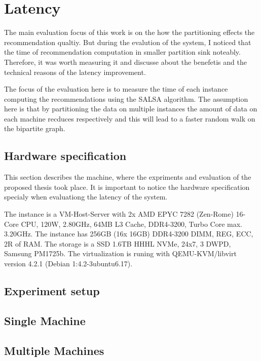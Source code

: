 \section{Latency}
\label{sec:eval-latency}
The main evaluation focus of this work is on the how the partitioning effects the recommendation qualtiy. But during the evalution of the system, I noticed that the time of recommendation computation in smaller partition sink noteably. Therefore, it was worth measuring it and discusse about the benefetis and the technical reasons of the latency improvement.


The focus of the evaluation here is to measure the time of each instance computing the recommendations using the SALSA algorithm. The assumption here is that by partitioning the data on multiple instances the amount of data on each machine recduces respectively and this will lead to a faster random walk on the bipartite graph. 

\subsection{Hardware specification}
\label{subsec:hardware-spec}
This section describes the machine, where the expriments and evaluation of the proposed thesis took place. It is important to notice the hardware specification specialy when evaluationg the latency of the system.

The instance is a VM-Host-Server with 2x AMD EPYC 7282 (Zen-Rome) 16-Core CPU, 120W, 2.80GHz, 64MB L3 Cache, DDR4-3200, Turbo Core max. 3.20GHz. The instance has 256GB (16x 16GB) DDR4-3200 DIMM, REG, ECC, 2R of RAM. The storage is a SSD 1.6TB HHHL NVMe, 24x7, 3 DWPD, Samsung PM1725b. The virtualization is runing with  QEMU-KVM/libvirt version 4.2.1 (Debian 1:4.2-3ubuntu6.17).


\subsection{Experiment setup}
\label{subsec:latency-experiment-setup}

\subsection{Single Machine}
\label{subsec:latency-single-machine}


\subsection{Multiple Machines}
\label{subsec:latency-multiple-machines}
